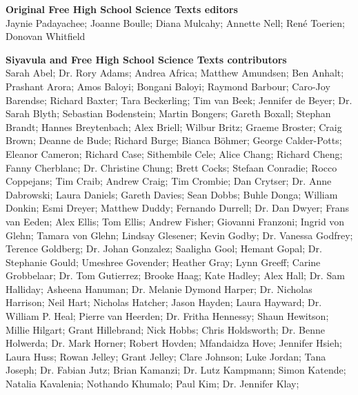 \textbf{\large Original Free High School Science Texts editors}\\

Jaynie Padayachee; Joanne Boulle; Diana Mulcahy; Annette Nell; René Toerien; Donovan Whitfield \par

\textbf{\large Siyavula and Free High School Science Texts contributors}\\

    Sarah Abel;
Dr. Rory Adams;
    Andrea Africa;
    Matthew Amundsen;
    Ben Anhalt;
    Prashant Arora;
    Amos Baloyi;
    Bongani Baloyi;
    Raymond Barbour;
    Caro-Joy Barendse;
    Richard Baxter;
    Tara Beckerling;
    Tim van Beek;
    Jennifer de Beyer;
Dr. Sarah Blyth;
    Sebastian Bodenstein;
    Martin Bongers;
    Gareth Boxall;
    Stephan Brandt;
    Hannes Breytenbach;
    Alex Briell;
    Wilbur Britz;
    Graeme Broster;
    Craig Brown;
    Deanne de Bude;
    Richard Burge;
    Bianca Böhmer;
    George Calder-Potts;
    Eleanor Cameron;
    Richard Case;
    Sithembile Cele;
    Alice Chang;
    Richard Cheng;
    Fanny Cherblanc;
Dr. Christine Chung;
    Brett Cocks;
    Stefaan Conradie;
    Rocco Coppejans;
    Tim Craib;
    Andrew Craig;
    Tim Crombie;
    Dan Crytser;
Dr. Anne Dabrowski;
    Laura Daniels;
    Gareth Davies;
    Sean Dobbs;
    Buhle Donga;
    William Donkin;
    Esmi Dreyer;
    Matthew Duddy;
    Fernando Durrell;
Dr. Dan Dwyer;
    Frans van Eeden;
    Alex Ellis;
    Tom Ellis;
    Andrew Fisher;
    Giovanni Franzoni;
    Ingrid von Glehn;
    Tamara von Glehn;
    Lindsay Glesener;
    Kevin Godby;
Dr. Vanessa Godfrey;
    Terence Goldberg;
Dr. Johan Gonzalez;
    Saaligha Gool;
    Hemant Gopal;
Dr. Stephanie Gould;
    Umeshree Govender;
    Heather Gray;
    Lynn Greeff;
    Carine Grobbelaar;
Dr. Tom Gutierrez;
    Brooke Haag;
    Kate Hadley;
    Alex Hall;
Dr. Sam Halliday;
    Asheena Hanuman;
Dr. Melanie Dymond Harper;
Dr. Nicholas Harrison;
    Neil Hart;
    Nicholas Hatcher;
    Jason Hayden;
    Laura Hayward;
Dr. William P. Heal;
    Pierre van Heerden;
Dr. Fritha Hennessy;
    Shaun Hewitson;
    Millie Hilgart;
    Grant Hillebrand;
    Nick Hobbs;
    Chris Holdsworth;
Dr. Benne Holwerda;
Dr. Mark Horner;
    Robert Hovden;
    Mfandaidza Hove;
    Jennifer Hsieh;
    Laura Huss;
    Rowan Jelley;
    Grant Jelley;
    Clare Johnson;
    Luke Jordan;
    Tana Joseph;
Dr. Fabian Jutz;
    Brian Kamanzi;
Dr. Lutz Kampmann;
    Simon Katende;
    Natalia Kavalenia;
    Nothando Khumalo;
    Paul Kim;
Dr. Jennifer Klay;
